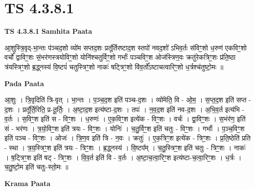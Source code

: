 \documentclass[17pt]{extarticle}
\begin{document}
\section{ TS 4.3.8.1 }

\textbf{TS 4.3.8.1 } \newline
\textbf{Samhita Paata} \newline

आ॒शुस्त्रि॒वृद्-भा॒न्तः प॑ञ्चद॒शो व्यो॑म सप्तद॒शः प्रतू᳚र्तिरष्टाद॒श स्तपो॑ नवद॒शो॑ ऽभिव॒र्तः स॑विꣳ॒॒शो ध॒रुण॑ एकविꣳ॒॒शो वर्चो᳚ द्वाविꣳ॒॒शः सं॒भर॑णस्त्रयोविꣳ॒॒शो योनि॑श्चतुर्विꣳ॒॒शो गर्भाः᳚ पञ्चविꣳ॒॒श ओज॑स्त्रिण॒वः क्रतु॑रेकत्रिꣳ॒॒शः प्र॑ति॒ष्ठा त्र॑यस्त्रिꣳ॒॒शो ब्र॒द्ध्नस्य॑ वि॒ष्टपं॑ चतुस्त्रिꣳ॒॒शो नाकः॑ षट्त्रिꣳ॒॒शो वि॑व॒र्तो᳚ऽष्टाचत्वारिꣳ॒॒शो ध॒र्त्रश्च॑तुष्टो॒मः ॥ \newline

\textbf{Pada Paata} \newline

आ॒शुः । त्रि॒वृदिति॑ त्रि-वृत् । भा॒न्तः । प॒ञ्च॒द॒श इति॑ पञ्च-द॒शः । व्यो॑मेति॒ वि - ओ॒म॒ । स॒प्त॒द॒श इति॑ सप्त - द॒शः । प्रतू᳚र्ति॒रिति॒ प्र-तू॒र्तिः॒ । अ॒ष्टा॒द॒श इत्य॑ष्टा-द॒शः । तपः॑ । न॒व॒द॒श इति॑ नव-द॒शः । अ॒भि॒व॒र्त इत्य॑भि - व॒र्तः । स॒विꣳ॒॒श इति॑ स - विꣳ॒॒शः । ध॒रुणः॑ । ए॒क॒विꣳ॒॒श इत्ये॑क - विꣳ॒॒शः । वर्चः॑ । द्वा॒विꣳ॒॒शः । स॒भंर॑ण॒ इति॑ सं - भर॑णः । त्र॒यो॒विꣳ॒॒श इति॑ त्रयः - विꣳ॒॒शः । योनिः॑ । च॒तु॒र्विꣳ॒॒श इति॑ चतुः - विꣳ॒॒शः । गर्भाः᳚ । प॒ञ्च॒विꣳ॒॒श इति॑ पञ्च - विꣳ॒॒शः । ओजः॑ । त्रि॒ण॒व इति॑ त्रि - न॒वः । क्रतुः॑ । ए॒क॒त्रिꣳ॒॒श इत्ये॑क - त्रिꣳ॒॒शः । प्र॒ति॒ष्ठेति॑ प्रति - स्था । त्र॒य॒स्त्रिꣳ॒॒श इति॑ त्रयः - त्रिꣳ॒॒शः । ब्र॒द्ध्नस्य॑ । वि॒ष्टप᳚म् । च॒तु॒स्त्रिꣳ॒॒श इति॑ चतुः - त्रिꣳ॒॒शः । नाकः॑ । ष॒ट्त्रिꣳ॒॒श इति॑ षट् - त्रिꣳ॒॒शः । वि॒व॒र्त इति॑ वि - व॒र्तः । अ॒ष्टा॒च॒त्वा॒रिꣳ॒॒श इत्य॑ष्टा-च॒त्वा॒रिꣳ॒॒शः । ध॒र्त्रः । च॒तु॒ष्टो॒म इति॑ चतुः-स्तो॒मः ॥  \newline


\textbf{Krama Paata} \newline
\end{document}

